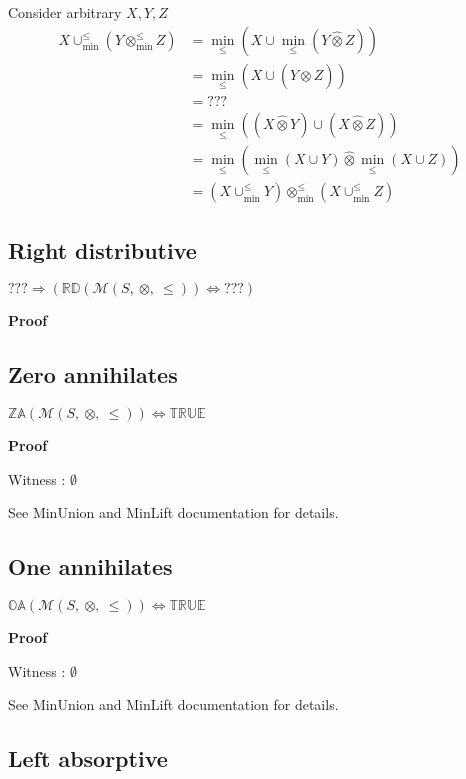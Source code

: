 \documentclass[10pt]{article}
\newcommand{\propname}[1]{{\mathbb{#1}}}
\newcommand{\minlift}{\otimes_{\min}^{\leq}}
\newcommand{\lift}{\hat{\otimes}}
\newcommand{\minunion}{\cup_{\min}^{\leq}}
\newcommand{\proof}{\vspace{1em} \textbf{Proof} \vspace{1em}}
\begin{document}
Consider arbitrary $X,Y,Z$
\begin{align*}
X \minunion (Y \minlift Z) 	& = \min_\leq(X \cup \min_\leq(Y \lift Z)) \\
							& = \min_\leq(X \cup (Y \lift Z)) \\
							& = ??? \\
							& = \min_\leq((X \lift Y) \cup (X \lift Z)) \\
							& = \min_\leq(\min_\leq(X \cup Y) \lift \min_\leq(X \cup Z)) \\
							& = (X \minunion Y) \minlift (X \minunion Z)
\end{align*}



\subsection{Right distributive}

$??? \Rightarrow (\propname{RD}(\mathcal{M}(S,\ \otimes,\ \leq))  \Leftrightarrow ???)$

\proof





\subsection{Zero annihilates}

$\propname{ZA}(\mathcal{M}(S,\ \otimes,\ \leq)) \Leftrightarrow \propname{TRUE}$

\proof

Witness : $\emptyset$

\vspace{0.5em}

See MinUnion and MinLift documentation for details.



\subsection{One annihilates}

$\propname{OA}(\mathcal{M}(S,\ \otimes,\ \leq)) \Leftrightarrow \propname{TRUE}$

\proof

Witness : $\emptyset$

\vspace{0.5em}

See MinUnion and MinLift documentation for details.


\subsection{Left absorptive}
\end{document}
